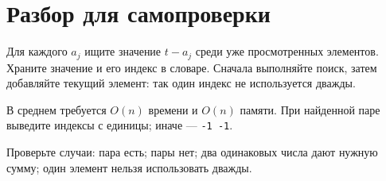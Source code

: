 \clearpage
\section*{Разбор для самопроверки}
Для каждого $a_j$ ищите значение $t-a_j$ среди уже просмотренных элементов. Храните значение и его индекс в словаре. Сначала выполняйте поиск, затем добавляйте текущий элемент: так один индекс не используется дважды.

В среднем требуется $O(n)$ времени и $O(n)$ памяти. При найденной паре выведите индексы с единицы; иначе --- \texttt{-1 -1}.

Проверьте случаи: пара есть; пары нет; два одинаковых числа дают нужную сумму; один элемент нельзя использовать дважды.
